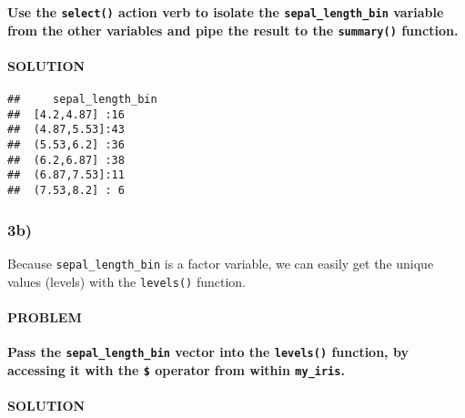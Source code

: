 \documentclass[]{article}
\newenvironment{Shaded}{\begin{snugshade}}{\end{snugshade}}
\newcommand{\KeywordTok}[1]{\textcolor[rgb]{0.13,0.29,0.53}{\textbf{#1}}}
\newcommand{\NormalTok}[1]{#1}
\newcommand{\OperatorTok}[1]{\textcolor[rgb]{0.81,0.36,0.00}{\textbf{#1}}}
\newcommand{\StringTok}[1]{\textcolor[rgb]{0.31,0.60,0.02}{#1}}
\let\oldparagraph\paragraph
\renewcommand{\paragraph}[1]{\oldparagraph{#1}\mbox{}}
\begin{document}
\textbf{Use the \texttt{select()} action verb to isolate the
\texttt{sepal\_length\_bin} variable from the other variables and pipe
the result to the \texttt{summary()} function.}

\hypertarget{solution-10}{%
\paragraph{SOLUTION}\label{solution-10}}

\begin{Shaded}
\end{Shaded}

\begin{verbatim}
##     sepal_length_bin
##  [4.2,4.87] :16     
##  (4.87,5.53]:43     
##  (5.53,6.2] :36     
##  (6.2,6.87] :38     
##  (6.87,7.53]:11     
##  (7.53,8.2] : 6
\end{verbatim}

\hypertarget{b-2}{%
\subsubsection{3b)}\label{b-2}}

Because \texttt{sepal\_length\_bin} is a factor variable, we can easily
get the unique values (levels) with the \texttt{levels()} function.

\hypertarget{problem-12}{%
\paragraph{PROBLEM}\label{problem-12}}

\textbf{Pass the \texttt{sepal\_length\_bin} vector into the
\texttt{levels()} function, by accessing it with the \texttt{\$}
operator from within \texttt{my\_iris}.}

\hypertarget{solution-11}{%
\paragraph{SOLUTION}\label{solution-11}}

\begin{Shaded}
\end{Shaded}
\end{document}
